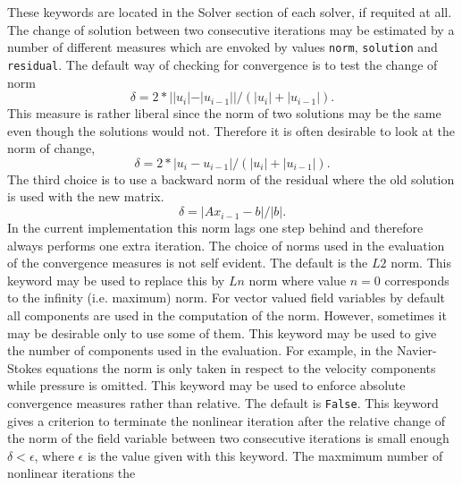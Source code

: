 These keywords are located in the Solver section of each solver, if requited at all.
\sifbegin
{} 
The change of solution between two consecutive iterations may be estimated by a number 
of different measures which are envoked by values \texttt{norm}, \texttt{solution} and
\texttt{residual}. The default way of checking for convergence is to test the 
change of norm
\begin{equation}
  \delta =  2*||u_i|-|u_{i-1}|| / (|u_i|+|u_{i-1}|).
\end{equation}
This measure is rather liberal since the norm of two solutions may be the same
even though the solutions would not. Therefore it is often desirable to look at the 
norm of change,
\begin{equation}
  \delta = 2*|u_i-u_{i-1}| / (|u_i|+|u_{i-1}|).
\end{equation}
The third choice is to use a backward norm of the residual 
where the old solution is used with the new
matrix. 
\begin{equation}
  \delta = |Ax_{i-1}-b| / |b|.
\end{equation}
In the current implementation this norm lags one step behind and therefore always 
performs one extra iteration.
%
The choice of norms used in the evaluation of the convergence measures is not self evident.
The default is the $L2$ norm. This keyword may be used to replace this by $Ln$ norm 
where value $n=0$ corresponds to the infinity (i.e. maximum) norm.
%
For vector valued field variables by default all components are used in the computation of
the norm. However, sometimes it may be desirable only to use some of them. This keyword 
may be used to give the number of components used in the evaluation. For example, in the 
Navier-Stokes equations the norm is only taken in respect to the velocity components while 
pressure is omitted.
%
This keyword may be used to enforce absolute convergence measures rather than relative. 
The default is \texttt{False}.
%
This keyword gives a criterion to
terminate the nonlinear iteration after the relative change of the norm of the field variable
between two consecutive iterations is small enough $\delta < \epsilon$,
where $\epsilon$ is the value given with this keyword.
%
The maxmimum number of nonlinear iterations the
